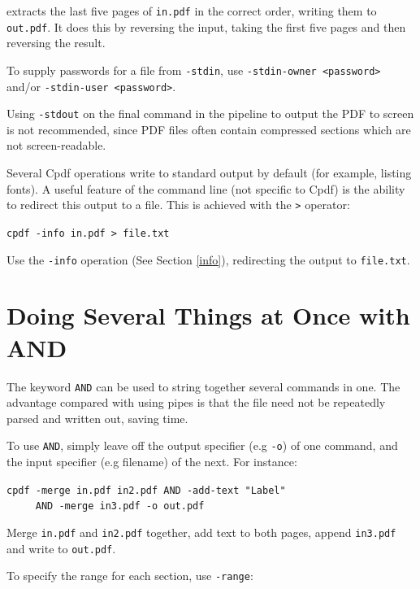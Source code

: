 \documentclass{book}
\begin{document}
\noindent extracts the last five pages of \texttt{in.pdf} in the correct order,
writing them to \texttt{out.pdf}. It does this by reversing the input, taking
the first five pages and then reversing the result.

To supply passwords for a file from \texttt{-stdin}, use \texttt{-stdin-owner <password>} and/or \texttt{-stdin-user <password>}.

Using \texttt{-stdout} on the final command in the pipeline to output the PDF
to screen is not recommended, since PDF files often contain compressed sections
which are not screen-readable.

Several Cpdf operations write to standard output by default (for
example, listing fonts). A useful feature of the command line (not specific to
Cpdf) is the ability to redirect this output to a file. This is
achieved with the \texttt{>} operator:

\begin{framed}
  \noindent\small\verb!cpdf -info in.pdf > file.txt!

  \vspace{2.5mm}
  \noindent Use the \texttt{-info} operation (See Section \ref{info}), redirecting the
output to \texttt{file.txt}.
\end{framed}

\section{Doing Several Things at Once with AND}
The keyword \texttt{AND} can be used to string together several commands in
one. The advantage compared with using pipes is that the file need not be
repeatedly parsed and written out, saving time.

To use \texttt{AND}, simply leave off the output specifier (e.g \texttt{-o}) of
one command, and the input specifier (e.g filename) of the next. For instance:

\begin{framed}
 \noindent \small\verb!cpdf -merge in.pdf in2.pdf AND -add-text "Label"!\\
  \noindent\small\verb!     AND -merge in3.pdf -o out.pdf!

  \vspace{2.5mm}
  \noindent Merge \texttt{in.pdf} and \texttt{in2.pdf} together, add text to both pages, append \texttt{in3.pdf} and write to \texttt{out.pdf}.
\end{framed}

\noindent To specify the range for each section, use \texttt{-range}:
\end{document}
